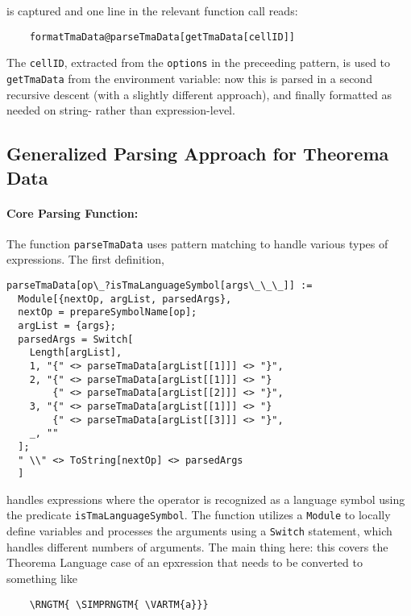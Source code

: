 is captured and one line in the relevant function call reads:

\begin{verbatim}
    formatTmaData@parseTmaData[getTmaData[cellID]]
\end{verbatim}

The \lstinline+cellID+, extracted from the \lstinline+options+ in the preceeding pattern, is used to \lstinline+getTmaData+ from the environment variable: now this is parsed in a second recursive descent (with a slightly different approach), and finally formatted as needed on string- rather than expression-level.

\subsection{Generalized Parsing Approach for Theorema Data}

\paragraph{Core Parsing Function:}

The function \texttt{parseTmaData} uses pattern matching to handle various types of expressions. The first definition, 

\begin{verbatim}
parseTmaData[op\_?isTmaLanguageSymbol[args\_\_\_]] := 
  Module[{nextOp, argList, parsedArgs}, 
  nextOp = prepareSymbolName[op]; 
  argList = {args}; 
  parsedArgs = Switch[
    Length[argList], 
    1, "{" <> parseTmaData[argList[[1]]] <> "}", 
    2, "{" <> parseTmaData[argList[[1]]] <> "}
        {" <> parseTmaData[argList[[2]]] <> "}", 
    3, "{" <> parseTmaData[argList[[1]]] <> "}
        {" <> parseTmaData[argList[[3]]] <> "}", 
    _, ""
  ]; 
  " \\" <> ToString[nextOp] <> parsedArgs
  ]
\end{verbatim}

handles expressions where the operator is recognized as a language symbol using the predicate \texttt{isTmaLanguageSymbol}. The function utilizes a \texttt{Module} to locally define variables and processes the arguments using a \texttt{Switch} statement, which handles different numbers of arguments. The main thing here: this covers the Theorema Language case of an epxression that needs to be converted to something like

\begin{verbatim}
    \RNGTM{ \SIMPRNGTM{ \VARTM{a}}}
\end{verbatim}

